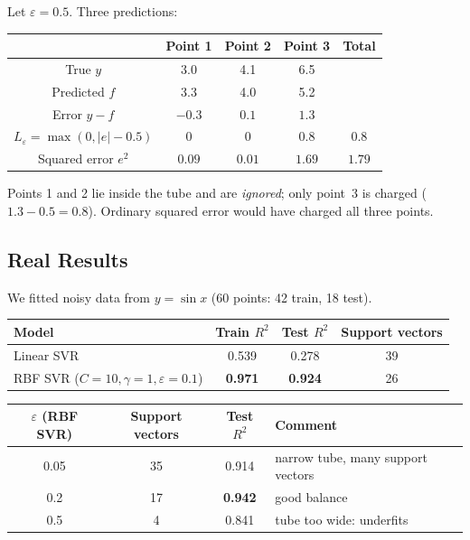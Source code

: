 \begin{example}
Let $\varepsilon=0.5$. Three predictions:

\begin{center}
\begin{tabular}{@{}c|ccc|c@{}}
\toprule
 & \textbf{Point 1} & \textbf{Point 2} & \textbf{Point 3} & \textbf{Total}\\
\midrule
True $y$ & 3.0 & 4.1 & 6.5 & \\
Predicted $f$ & 3.3 & 4.0 & 5.2 & \\
Error $y-f$ & $-0.3$ & $0.1$ & $1.3$ & \\
\midrule
$L_\varepsilon=\max(0,|e|-0.5)$ & $0$ & $0$ & $0.8$ & $\mathbf{0.8}$\\
Squared error $e^2$ & $0.09$ & $0.01$ & $1.69$ & $1.79$\\
\bottomrule
\end{tabular}
\end{center}
Points 1 and 2 lie inside the tube and are \emph{ignored}; only point~3 is charged ($1.3-0.5=0.8$). Ordinary squared error would have charged all three points.
\end{example}

\subsection{Real Results}

We fitted noisy data from $y=\sin x$ (60 points: 42 train, 18 test).

\begin{center}
\begin{tabular}{@{}lccc@{}}
\toprule
\textbf{Model} & \textbf{Train $R^2$} & \textbf{Test $R^2$} & \textbf{Support vectors}\\
\midrule
Linear SVR & 0.539 & 0.278 & 39\\
RBF SVR ($C=10,\gamma=1,\varepsilon=0.1$) & \textbf{0.971} & \textbf{0.924} & 26\\
\bottomrule
\end{tabular}
\end{center}

\begin{center}
\begin{tabular}{@{}cccl@{}}
\toprule
\textbf{$\varepsilon$} (RBF SVR) & \textbf{Support vectors} & \textbf{Test $R^2$} & \textbf{Comment}\\
\midrule
0.05 & 35 & 0.914 & narrow tube, many support vectors\\
0.2 & 17 & \textbf{0.942} & good balance\\
0.5 & 4 & 0.841 & tube too wide: underfits\\
\bottomrule
\end{tabular}
\end{center}

